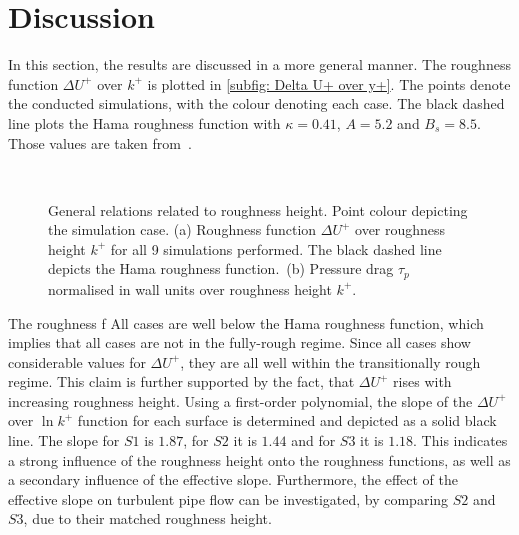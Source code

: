 \section{Discussion} \label{sec: discussion}

In this section, the results are discussed in a more general manner.
The roughness function $\Delta U^+$ over $k^+$ is plotted in \autoref{subfig: Delta U+ over y+}.
The points denote the conducted simulations, with the colour denoting each case.
The black dashed line plots the Hama roughness function with $\kappa = 0.41$, $A = 5.2$ and $B_s = 8.5$.
Those values are taken from~\cite{chungPredictingDragRough2021}.
\begin{figure}[h]
    \centering
    \begin{subfigure}{0.495\textwidth}
        \subcaption{}
        
        \label{subfig: Delta U+ over y+}
    \end{subfigure}
    \hfill
    \begin{subfigure}{0.495\textwidth}
        \subcaption{}
        
        \label{subfig: taup over k+}
    \end{subfigure}
    \\[-10pt]
    \caption[General relations of $\Delta U^+$ and $\tau_p$ over $k^+$]{General relations related to roughness height. Point colour depicting the simulation case. (a) Roughness function $\Delta U^+$ over roughness height $k^+$ for all 9 simulations performed. The black dashed line depicts the Hama roughness function.~(b) Pressure drag $\tau_p$ normalised in wall units over roughness height $k^+$.}
    \label{fig: general correlations}
\end{figure}
The roughness f
All cases are well below the Hama roughness function, which implies that all cases are not in the fully-rough regime.
Since all cases show considerable values for $\Delta U^+$, they are all well within the transitionally rough regime.
This claim is further supported by the fact, that $\Delta U^+$ rises with increasing roughness height.
Using a first-order polynomial, the slope of the $\Delta U^+$ over $\ln k^+$ function for each surface is determined and depicted as a solid black line.
The slope for $S1$ is $1.87$, for $S2$ it is $1.44$ and for $S3$ it is $1.18$.
This indicates a strong influence of the roughness height onto the roughness functions, as well as a secondary influence of the effective slope.
Furthermore, the effect of the effective slope on turbulent pipe flow can be investigated, by comparing $S2$ and $S3$, due to their matched roughness height.
